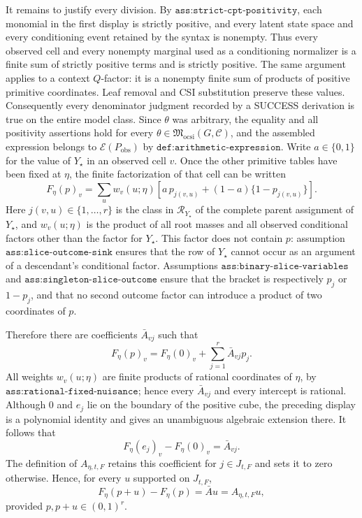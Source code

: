 It remains to justify every division. By \(\texttt{ass:strict-cpt-positivity}\), each monomial in the first display is strictly positive, and every latent state space and every conditioning event retained by the syntax is nonempty. Thus every observed cell and every nonempty marginal used as a conditioning normalizer is a finite sum of strictly positive terms and is strictly positive. The same argument applies to a context \(Q\)-factor: it is a nonempty finite sum of products of positive primitive coordinates. Leaf removal and CSI substitution preserve these values. Consequently every denominator judgment recorded by a SUCCESS derivation is true on the entire model class. Since \(\theta\) was arbitrary, the equality and all positivity assertions hold for every \(\theta\in\mathfrak M_{\mathrm{ocsi}}(G,\mathcal C)\), and the assembled expression belongs to \(\mathscr E(P_{\mathrm{obs}})\) by \(\texttt{def:arithmetic-expression}\).
Write \(a\in\{0,1\}\) for the value of \(Y_\star\) in an observed cell \(v\). Once the other primitive tables have been fixed at \(\eta\), the finite factorization of that cell can be written
\[
 F_{\eta}(p)_v
 =\sum_{u} w_v(u;\eta)
 \left[a\,p_{j(v,u)}+(1-a)\{1-p_{j(v,u)}\}\right].
\]
Here \(j(v,u)\in\{1,\ldots,r\}\) is the class in \(\mathcal R_{Y_\star}\) of the complete parent assignment of \(Y_\star\), and \(w_v(u;\eta)\) is the product of all root masses and all observed conditional factors other than the factor for \(Y_\star\). This factor does not contain \(p\): assumption \(\texttt{ass:slice-outcome-sink}\) ensures that the row of \(Y_\star\) cannot occur as an argument of a descendant's conditional factor. Assumptions \(\texttt{ass:binary-slice-variables}\) and \(\texttt{ass:singleton-slice-outcome}\) ensure that the bracket is respectively \(p_j\) or \(1-p_j\), and that no second outcome factor can introduce a product of two coordinates of \(p\).

Therefore there are coefficients \(\bar A_{vj}\) such that
\[
 F_\eta(p)_v=F_\eta(0)_v+\sum_{j=1}^r\bar A_{vj}p_j.
\]
All weights \(w_v(u;\eta)\) are finite products of rational coordinates of \(\eta\), by \(\texttt{ass:rational-fixed-nuisance}\); hence every \(\bar A_{vj}\) and every intercept is rational. Although \(0\) and \(e_j\) lie on the boundary of the positive cube, the preceding display is a polynomial identity and gives an unambiguous algebraic extension there. It follows that
\[
 F_\eta(e_j)_v-F_\eta(0)_v=\bar A_{vj}.
\]
The definition of \(A_{\eta,t,F}\) retains this coefficient for \(j\in J_{t,F}\) and sets it to zero otherwise. Hence, for every \(u\) supported on \(J_{t,F}\),
\[
 F_\eta(p+u)-F_\eta(p)=\bar A u=A_{\eta,t,F}u,
\]
provided \(p,p+u\in(0,1)^r\).

